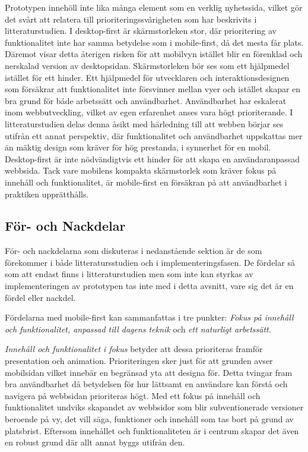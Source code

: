 \documentclass[11pt]{article}
\begin{document}
Prototypen innehöll inte lika många element som en verklig nyhetssida, vilket gör det svårt att relatera till prioriteringssvårigheten som har beskrivits i litteraturstudien. I desktop-first är skärmstorleken stor, där prioritering av funktionalitet inte har samma betydelse som i mobile-first, då det mesta får plats. Däremot visar detta återigen risken för att mobilvyn istället blir en förenklad och nerskalad version av desktopsidan. Skärmstorleken bör ses som ett hjälpmedel istället för ett hinder. Ett hjälpmedel för utvecklaren och interaktionsdesignen som försäkrar att funktionalitet inte försvinner mellan vyer och istället skapar en bra grund för både arbetssätt och användbarhet. Användbarhet har eskalerat inom webbutveckling, vilket av egen erfarenhet anses vara högt prioriterande. I litteraturstudien delas denna åsikt med härledning till att webben börjar ses utifrån ett annat perspektiv, där funktionalitet och användbarhet uppskattas mer än mäktig design som kräver för hög prestanda, i synnerhet för en mobil. Desktop-first är inte nödvändigtvis ett hinder för att skapa en användaranpassad webbsida. Tack vare mobilens kompakta skärmstorlek som kräver fokus på innehåll och funktionalitet, är mobile-first en försäkran på att användbarhet i praktiken upprätthålls.

\subsection{För- och Nackdelar}
För- och nackdelarna som diskuteras i nedanstående sektion är de som förekommer i både litteratursstudien och i implementeringsfasen. De fördelar så som att endast finns i litteraturstudien men som inte kan styrkas av implementeringen av prototypen tas inte med i detta avsnitt, vare sig det är en fördel eller nackdel.

Fördelarna med mobile-first kan sammanfattas i tre punkter: \textit{Fokus på innehåll och funktionalitet, anpassad till dagens teknik} och \textit{ett naturligt arbetssätt.} 

\textit{Innehåll och funktionalitet i fokus} betyder att dessa prioriteras framför presentation och animation. Prioriteringen sker just för att grunden avser mobilsidan vilket innebär en begränsad yta att designa för. Detta tvingar fram bra användbarhet då betydelsen för hur lättsamt en användare kan förstå och navigera på webbsidan prioriteras högt. Med ett fokus på innehåll och funktionalitet undviks skapandet av webbsidor som blir subventionerade versioner beroende på vy, det vill säga, funktioner och innehåll som tas bort på grund av platsbrist. Eftersom innehållet och funktionaliteten är i centrum skapar det även en robust grund där allt annat byggs utifrån den.
\end{document}
